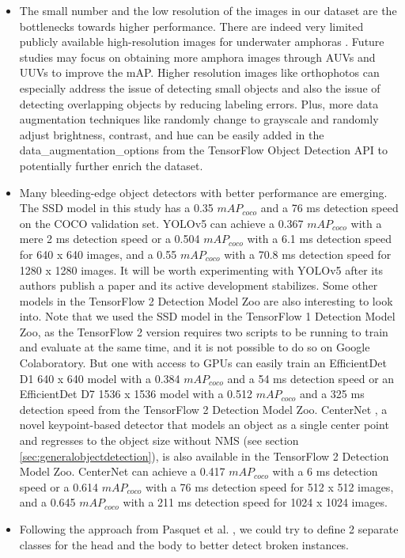 \documentclass[a4paper, 11pt, oneside]{article}
\begin{document}
\begin{itemize}
  \item The small number and the low resolution of the images in our dataset are the bottlenecks towards higher
  performance. There are indeed very limited publicly available high-resolution images for underwater amphoras
  \cite{pasquet2017amphora}. Future studies may focus on obtaining more amphora images through AUVs and UUVs to improve
  the mAP. Higher resolution images like orthophotos can especially address the issue of detecting
  small objects \cite{kisantal2019augmentation} and also the issue of detecting overlapping objects by reducing labeling
  errors. Plus, more data augmentation techniques like randomly change to grayscale and randomly adjust brightness,
  contrast, and hue can be easily added in the data\_augmentation\_options from the TensorFlow Object Detection API
  to potentially further enrich the dataset.
  \item Many bleeding-edge object detectors with better performance are emerging. The SSD model in this study
  has a 0.35 $mAP_{coco}$ and a 76 ms detection speed on the COCO validation set. YOLOv5 can achieve a 0.367
  $mAP_{coco}$ with a mere 2 ms detection speed or a 0.504 $mAP_{coco}$ with a 6.1 ms detection speed for 640 x 640 images,
  and a 0.55 $mAP_{coco}$ with a 70.8 ms detection speed for 1280 x 1280 images. It will be worth experimenting with
  YOLOv5 after its authors publish a paper and its active development stabilizes. Some other models in the TensorFlow 2
  Detection Model Zoo \cite{tf2detectionmodelzoo} are also interesting to look into. Note that we used the SSD
  model in the TensorFlow 1 Detection Model Zoo, as the TensorFlow 2 version requires two scripts to be running
  to train and evaluate at the same time, and it is not possible to do so on Google Colaboratory. But one with access to
  GPUs can easily train an EfficientDet \cite{tan2020efficientdet} D1 640 x 640 model with a 0.384 $mAP_{coco}$ and a
  54 ms detection speed or an EfficientDet D7 1536 x 1536 model with a 0.512 $mAP_{coco}$ and a 325 ms detection speed
  from the TensorFlow 2 Detection Model Zoo. CenterNet \cite{zhou2019objects}, a novel keypoint-based detector that
  models an object as a single center point and regresses to the object size without NMS
  (see section \ref{sec:generalobjectdetection}), is also available in the TensorFlow 2 Detection Model Zoo. CenterNet
  can achieve a 0.417 $mAP_{coco}$ with a 6 ms detection speed or a 0.614 $mAP_{coco}$ with a 76 ms detection
  speed for 512 x 512 images, and a 0.645 $mAP_{coco}$ with a 211 ms detection speed for 1024 x 1024 images.
  \item Following the approach from Pasquet et al. \cite{pasquet2017amphora}, we could try to define 2 separate classes
  for the head and the body to better detect broken instances.
\end{itemize}

\newpage

\printbibliography
\end{document}
